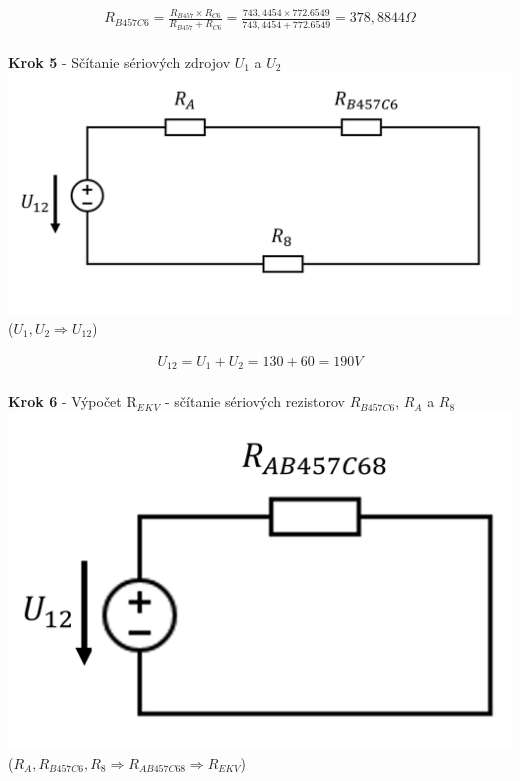 \begin{gather*}
    R_{B457C6} = \frac{R_{B457} \times R_{C6}}{R_{B457} + R_{C6}} =
    \frac{743,4454 \times 772.6549}{743,4454 +772.6549} =
    378,8844 \Omega \\
\end{gather*}

\begin{center}
\textbf{Krok 5} - Sčítanie sériových zdrojov $U_1$ a $U_2$
\includegraphics[scale=0.7,keepaspectratio]{fig/c5.png} \\
($U_{1},U_{2} \Rightarrow U_{12}$)
\end{center}

\begin{gather*}
   U_{12} = U_{1} + U_{2} = 130 + 60 = 190 V \\
\end{gather*}

\begin{center}
\textbf{Krok 6} - Výpočet R$_E$$_K$$_V$ - sčítanie sériových rezistorov $R_{B457C6}$, $R_A$ a $R_8$
\\
\includegraphics[scale=0.8,keepaspectratio]{fig/c6.png} \\
($R_{A}, R_{B457C6}, R_{8} \Rightarrow R_{AB457C68} \Rightarrow R_{EKV}$)
\end{center}


